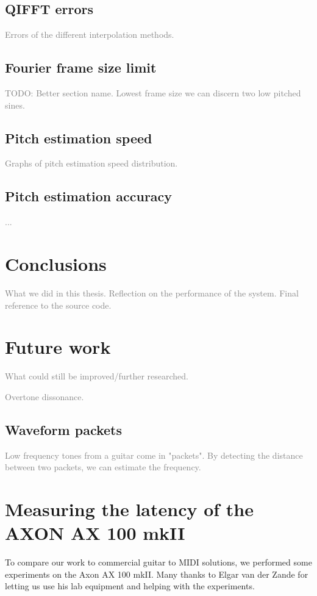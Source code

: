 \documentclass[a4paper,10pt,twocolumn]{article}
\begin{document}
\subsection{QIFFT errors}  \label{sub:exp:qifft}
\textcolor{gray}{Errors of the different interpolation methods.}


\subsection{Fourier frame size limit}
\textcolor{gray}{TODO: Better section name. Lowest frame size we can discern two low pitched sines.}


\subsection{Pitch estimation speed}
\textcolor{gray}{Graphs of pitch estimation speed distribution.}


\subsection{Pitch estimation accuracy}
\textcolor{gray}{...}



\section{Conclusions}
\textcolor{gray}{What we did in this thesis. Reflection on the performance of the system. Final reference to the source code.}



\section{Future work}  \label{sec:future}
\textcolor{gray}{What could still be improved/further researched.}

\textcolor{gray}{Overtone dissonance.}


\subsection{Waveform packets}  \label{sub:waveform_packet}
\textcolor{gray}{Low frequency tones from a guitar come in "packets". By detecting the distance between two packets, we can estimate the frequency.}



\appendix
\section{Measuring the latency of the AXON AX 100 mkII}  \label{sec:ax100}
To compare our work to commercial guitar to MIDI solutions, we performed some experiments on the Axon AX 100 mkII. Many thanks to Elgar van der Zande for letting us use his lab equipment and helping with the experiments.
\end{document}
